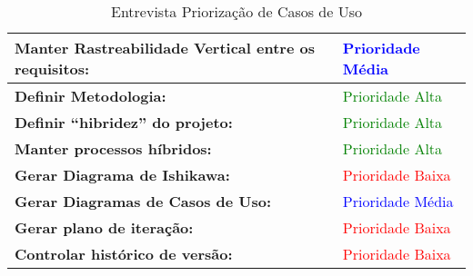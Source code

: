\begin{itemize}
\begin{table}[H]
\begin{tabular}{|p{7cm}|p{3cm}|}
\textbf{Manter Rastreabilidade Vertical entre os requisitos:} &
\textcolor{blue}{Prioridade Média}
\\ \hline
\textbf{Definir Metodologia:} &
\textcolor{green}{Prioridade Alta}
\\ \hline
\textbf{Definir “hibridez” do projeto:} &
\textcolor{green}{Prioridade Alta}
\\ \hline
\textbf{Manter processos híbridos:} &
\textcolor{green}{Prioridade Alta}
\\ \hline
\textbf{Gerar Diagrama de Ishikawa:} &
\textcolor{red}{Prioridade Baixa}
\\ \hline
\textbf{Gerar Diagramas de Casos de Uso:} &
\textcolor{blue}{Prioridade Média}
\\ \hline
\textbf{Gerar plano de iteração:} &
\textcolor{red}{Prioridade Baixa}
\\ \hline
\textbf{Controlar histórico de versão:} &
\textcolor{red}{Prioridade Baixa}
\\ \hline
\end{tabular}
\caption{Entrevista Priorização de Casos de Uso}
\label{tab:frameworkproblema}
\end{table}
\end{itemize}